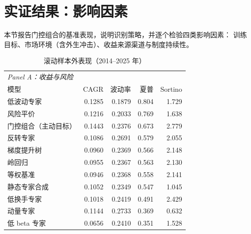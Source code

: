 \section{实证结果：影响因素}
\label{sec:factors}

本节报告门控组合的基准表现，说明识别策略，并逐个检验四类影响因素：
训练目标、市场环境（含外生冲击）、收益来源渠道与制度持续性。

\begin{table}[htbp]
\centering
\caption{滚动样本外表现（2014--2025 年）}
\label{tab:main}
\begin{threeparttable}
\footnotesize
\begin{tabular}{lrrrr}
\toprule
\multicolumn{5}{l}{\textit{Panel A：收益与风险}} \\
模型 & CAGR & 波动率 & 夏普 & Sortino \\
\midrule
低波动专家 & 0.1285 & 0.1879 & 0.804 & 1.729 \\
风险平价 & 0.1216 & 0.2033 & 0.769 & 1.638 \\
门控组合（主动目标） & 0.1443 & 0.2376 & 0.673 & 2.779 \\
反转专家 & 0.1086 & 0.2691 & 0.579 & 2.055 \\
梯度提升树 & 0.0960 & 0.2369 & 0.566 & 2.148 \\
岭回归 & 0.0955 & 0.2367 & 0.563 & 2.130 \\
等权基准 & 0.0946 & 0.2368 & 0.558 & 2.141 \\
静态专家合成 & 0.1052 & 0.2349 & 0.547 & 1.045 \\
低换手专家 & 0.1018 & 0.2419 & 0.491 & 2.429 \\
动量专家 & 0.1144 & 0.2733 & 0.369 & 0.632 \\
低 beta 专家 & 0.0656 & 0.2410 & 0.351 & 1.528 \\
\bottomrule
\end{tabular}


\end{threeparttable}
\end{table}
